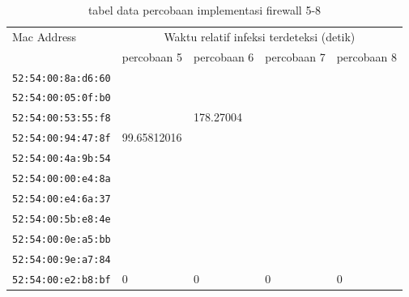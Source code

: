 \begin{table}[H]
	\caption{tabel data percobaan implementasi firewall 5-8}
	\label{table:data percobaan implementasi firewall 5_8}
	\centering
	\footnotesize
	\begin{tabular}{|l|l|l|l|l|}
		\hline
		\multirow{2}{*}{Mac Address} & \multicolumn{4}{c|}{Waktu relatif infeksi terdeteksi (detik)} \\ \cline{2-5} 
		& percobaan 5 & percobaan 6 & percobaan 7 & percobaan 8\\ \hline
		\footnotesize{\verb|52:54:00:8a:d6:60|} &  &  &  & \\ \hline
		\footnotesize{\verb|52:54:00:05:0f:b0|} &  &  &  & \\ \hline
		\footnotesize{\verb|52:54:00:53:55:f8|} &  & 178.27004 &  & \\ \hline
		\footnotesize{\verb|52:54:00:94:47:8f|} & 99.65812016 &  &  & \\ \hline
		\footnotesize{\verb|52:54:00:4a:9b:54|} &  &  &  & \\ \hline
		\footnotesize{\verb|52:54:00:00:e4:8a|} &  &  &  & \\ \hline
		\footnotesize{\verb|52:54:00:e4:6a:37|} &  &  &  & \\ \hline
		\footnotesize{\verb|52:54:00:5b:e8:4e|} &  &  &  & \\ \hline
		\footnotesize{\verb|52:54:00:0e:a5:bb|} &  &  &  & \\ \hline
		\footnotesize{\verb|52:54:00:9e:a7:84|} &  &  &  & \\ \hline
		\footnotesize{\verb|52:54:00:e2:b8:bf|} & 0 & 0 & 0 & 0\\ \hline
	\end{tabular}
\end{table}

